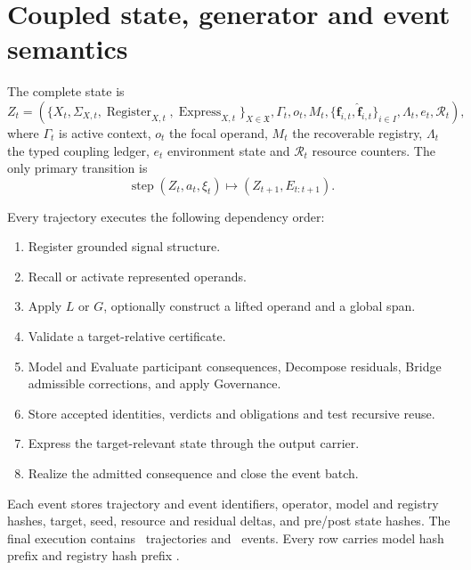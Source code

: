 \documentclass[10pt]{article}
\newcommand{\Reg}{\operatorname{Register}}
\newcommand{\Exp}{\operatorname{Express}}
\begin{document}
\section{Coupled state, generator and event semantics}
The complete state is
\begin{equation}
Z_t=\left(
\{X_t,\Sigma_{X,t},\Reg_{X,t},\Exp_{X,t}\}_{X\in\mathfrak X},
\Gamma_t,o_t,M_t,\{\mathbf f_{i,t},\widehat{\mathbf f}_{i,t}\}_{i\in I},
\Lambda_t,e_t,\mathcal R_t
\right),
\end{equation}
where $\Gamma_t$ is active context, $o_t$ the focal operand, $M_t$ the recoverable registry, $\Lambda_t$ the typed coupling ledger, $e_t$ environment state and $\mathcal R_t$ resource counters. The only primary transition is
\begin{equation}
\operatorname{step}(Z_t,a_t,\xi_t)\mapsto (Z_{t+1},E_{t:t+1}).
\end{equation}

Every trajectory executes the following dependency order:
\begin{enumerate}
\item Register grounded signal structure.
\item Recall or activate represented operands.
\item Apply $L$ or $G$, optionally construct a lifted operand and a global span.
\item Validate a target-relative certificate.
\item Model and Evaluate participant consequences, Decompose residuals, Bridge admissible corrections, and apply Governance.
\item Store accepted identities, verdicts and obligations and test recursive reuse.
\item Express the target-relevant state through the output carrier.
\item Realize the admitted consequence and close the event batch.
\end{enumerate}

Each event stores trajectory and event identifiers, operator, model and registry hashes, target, seed, resource and residual deltas, and pre/post state hashes. The final execution contains \TotalTraj\ trajectories and \TotalEvents\ events. Every row carries model hash prefix \texttt{\ModelHash} and registry hash prefix \texttt{\RegistryHash}.
\end{document}

